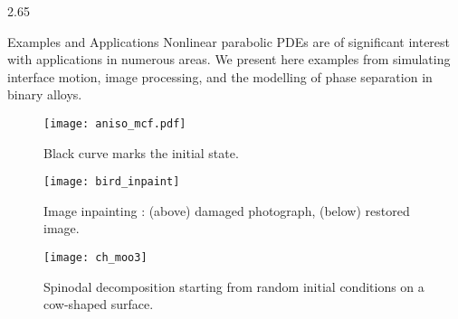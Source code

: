 \documentclass[]{beamer} %
\newlength{\onecolwid}
\begin{document}
\begin{frame}[t]
\begin{columns}[t]
\begin{column}{2.65\onecolwid}
\vspace{-0.15in}
\begin{block}{Examples and Applications}
Nonlinear parabolic PDEs are of significant interest with applications in numerous areas. 
We present here examples from simulating interface motion, image processing, and the modelling of phase separation in binary alloys.
\vspace{-.15in}
	\begin{figure}
		\begin{minipage}{0.85\onecolwid}\centering
\texttt{[image: aniso\_mcf.pdf]}
			\caption{Black curve marks the initial state.}
		\end{minipage}
		\begin{minipage}{0.80\onecolwid}\centering 
\texttt{[image: bird\_inpaint]}
	\caption{Image inpainting \cite{Schonlieb2011}: (above) damaged photograph, (below) restored image.}
		\end{minipage}
		\begin{minipage}{0.85\onecolwid}\centering
\texttt{[image: ch\_moo3]}
			\caption{Spinodal decomposition starting from random initial conditions on a cow-shaped surface.}
		\end{minipage}
	\end{figure}
\end{block}
				
			\end{column} %
			

\end{columns}
\end{frame}
\end{document}
